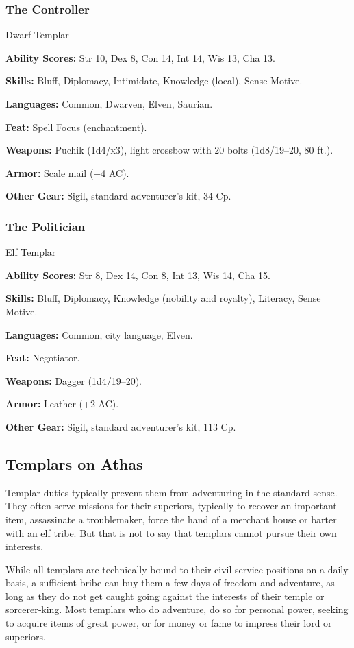 \subsubsection{The Controller}
Dwarf Templar

\textbf{Ability Scores:} Str 10, Dex 8, Con 14, Int 14, Wis 13, Cha 13.

\textbf{Skills:} Bluff, Diplomacy, Intimidate, Knowledge (local), Sense Motive.

\textbf{Languages:} Common, Dwarven, Elven, Saurian.

\textbf{Feat:} Spell Focus (enchantment).

\textbf{Weapons:} Puchik (1d4/x3), light crossbow with 20 bolts (1d8/19–20, 80 ft.).

\textbf{Armor:} Scale mail (+4 AC).

\textbf{Other Gear:} Sigil, standard adventurer's kit, 34 Cp.

\subsubsection{The Politician}
Elf Templar

\textbf{Ability Scores:} Str 8, Dex 14, Con 8, Int 13, Wis 14, Cha 15.

\textbf{Skills:} Bluff, Diplomacy, Knowledge (nobility and royalty), Literacy, Sense Motive.

\textbf{Languages:} Common, city language, Elven.

\textbf{Feat:} Negotiator.

\textbf{Weapons:} Dagger (1d4/19–20).

\textbf{Armor:} Leather (+2 AC).

\textbf{Other Gear:} Sigil, standard adventurer's kit, 113 Cp.

\subsection{Templars on Athas}

Templar duties typically prevent them from adventuring in the standard sense. They often serve missions for their superiors, typically to recover an important item, assassinate a troublemaker, force the hand of a merchant house or barter with an elf tribe. But that is not to say that templars cannot pursue their own interests.

While all templars are technically bound to their civil service positions on a daily basis, a sufficient bribe can buy them a few days of freedom and adventure, as long as they do not get caught going against the interests of their temple or sorcerer‐king. Most templars who do adventure, do so for personal power, seeking to acquire items of great power, or for money or fame to impress their lord or superiors.

